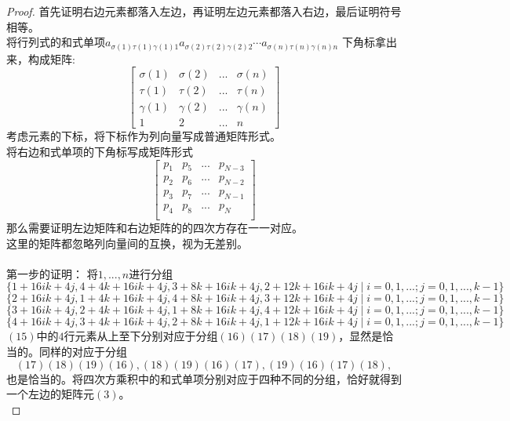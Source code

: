 \documentclass[twoside,a4paper,CCT]{cctart}   %
\begin{document}
\begin{proof}
首先证明右边元素都落入左边，再证明左边元素都落入右边，最后证明符号相等。\\
将行列式的和式单项$a_{\sigma(1)\tau(1)\gamma(1)1} a_{\sigma(2)\tau(2)\gamma(2)2}\cdots a_{\sigma(n)\tau(n)\gamma(n)n}$ 下角标拿出来，构成矩阵:
\begin{equation}\begin{bmatrix}\sigma(1)&\sigma(2)&...&\sigma(n)\\\tau(1)&\tau(2)&...&\tau(n)\\\gamma(1)&\gamma(2)&...&\gamma(n)\\
1&2&...&n\end{bmatrix}\end{equation}
考虑元素的下标，将下标作为列向量写成普通矩阵形式。\\
将右边和式单项的下角标写成矩阵形式\begin{equation}\begin{bmatrix}p_{1}&p_{5}&...&p_{N-3}\\p_{2}&p_{6}&...&p_{N-2}\\p_{3}&p_{7}&...&p_{N-1}\\p_{4}&p_{8}&...&p_{N}\\\end{bmatrix}\end{equation}
那么需要证明左边矩阵和右边矩阵的的四次方存在一一对应。\\
这里的矩阵都忽略列向量间的互换，视为无差别。\\\\
第一步的证明：
将$1,...,n$进行分组
\begin{equation}\{1+16ik+4j,4+4k+16ik+4j,3+8k+16ik+4j,2+12k+16ik+4j \mid i=0,1,...;j=0,1,...,k-1\}\end{equation}
\begin{equation}\{2+16ik+4j,1+4k+16ik+4j,4+8k+16ik+4j,3+12k+16ik+4j \mid i=0,1,...;j=0,1,...,k-1\}\end{equation}
\begin{equation}\{3+16ik+4j,2+4k+16ik+4j,1+8k+16ik+4j,4+12k+16ik+4j \mid i=0,1,...;j=0,1,...,k-1\}\end{equation}
\begin{equation}\{4+16ik+4j,3+4k+16ik+4j,2+8k+16ik+4j,1+12k+16ik+4j \mid i=0,1,...;j=0,1,...,k-1\}\end{equation}
$(15)$中的$4$行元素从上至下分别对应于分组$(16)(17)(18)(19)$，显然是恰当的。同样的对应于分组
$$(17)(18)(19)(16),(18)(19)(16)(17),(19)(16)(17)(18),$$也是恰当的。将四次方乘积中的和式单项分别对应于四种不同的分组，恰好就得到一个左边的矩阵元$(3)$。\\

\end{proof}
\end{document}
